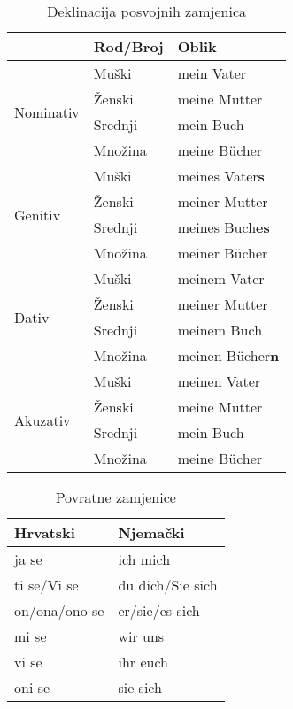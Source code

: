 \documentclass[12pt,german]{article}
\begin{document}
\begin{multicols}{2}
\begin{table*}[htb]
\caption{Deklinacija posvojnih zamjenica}
\begin{tabular}{lll}
\toprule
  & Rod/Broj & Oblik \\
  \midrule
  \multirow{4}{3mm}{\begin{sideways}\parbox{20mm}{Nominativ}\end{sideways}}
  & Muški & mein Vater \\
  & Ženski & meine Mutter \\
  & Srednji & mein Buch \\
  & Množina & meine B\"ucher \\
  \midrule
  \multirow{4}{3mm}{\begin{sideways}\parbox{15mm}{Genitiv}\end{sideways}}
  & Muški & meines Vater\bf{s} \\
  & Ženski & meiner Mutter \\
  & Srednji & meines Buch\bf{es} \\
  & Množina & meiner B\"ucher \\
  \midrule
  \multirow{4}{3mm}{\begin{sideways}\parbox{12mm}{Dativ}\end{sideways}}
  & Muški & meinem Vater \\
  & Ženski & meiner Mutter \\
  & Srednji & meinem Buch \\
  & Množina & meinen B\"ucher\bf{n} \\
  \midrule
  \multirow{4}{3mm}{\begin{sideways}\parbox{18mm}{Akuzativ}\end{sideways}}
  & Muški & meinen Vater \\
  & Ženski & meine Mutter \\
  & Srednji & mein Buch \\
  & Množina & meine B\"ucher \\
  \bottomrule
\end{tabular}
\end{table*}

\begin{table}[H]
\caption{Povratne zamjenice}
\begin{tabular}{ll}
\toprule
Hrvatski  &  Njemački \\
\midrule
ja se & ich mich \\
ti se/Vi se & du dich/Sie sich \\
on/ona/ono se & er/sie/es sich \\
mi se & wir uns \\
vi se & ihr euch \\
oni se & sie sich \\
\bottomrule
\end{tabular}
\end{table}


\end{multicols}
\end{document}
